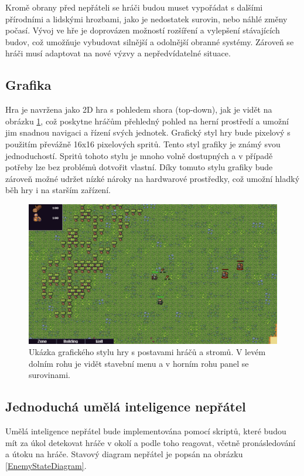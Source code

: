 Kromě obrany před nepřáteli se hráči budou muset vypořádat s dalšími přírodními a lidskými hrozbami, jako je nedostatek surovin, nebo náhlé změny počasí. Vývoj ve hře je doprovázen možností rozšíření a vylepšení stávajících budov, což umožňuje vybudovat silnější a odolnější obranné systémy. Zároveň se hráči musí adaptovat na nové výzvy a nepředvídatelné situace.
\newpage 

\subsection{Grafika}
Hra je navržena jako 2D hra s pohledem shora (top-down), jak je vidět na obrázku \ref{GraphicStyle}, což poskytne hráčům přehledný pohled na herní prostředí a umožní jim snadnou navigaci a řízení svých jednotek. Grafický styl hry bude pixelový s použitím převážně 16x16 pixelových spritů. Tento styl grafiky je známý svou jednoduchostí. Spritů tohoto stylu je mnoho volně dostupných a v případě potřeby lze bez problémů dotvořit vlastní. Díky tomuto stylu grafiky bude zároveň možné udržet nízké nároky na hardwarové prostředky, což umožní hladký běh hry i na starším zařízení.

\begin{figure}[H]
	\centering
	\includegraphics[scale=0.55]{obrazky-figures/GraphicStyle.png}
	\caption{Ukázka grafického stylu hry s postavami hráčů a stromů. V levém dolním rohu je vidět stavební menu a v horním rohu panel se surovinami.}
	\label{GraphicStyle}
\end{figure}

\subsection{Jednoduchá umělá inteligence nepřátel}
Umělá inteligence nepřátel bude implementována pomocí skriptů, které budou mít za úkol detekovat hráče v okolí a podle toho reagovat, včetně pronásledování a útoku na hráče. Stavový diagram nepřátel je popsán na obrázku \ref{EnemyStateDiagram}.

